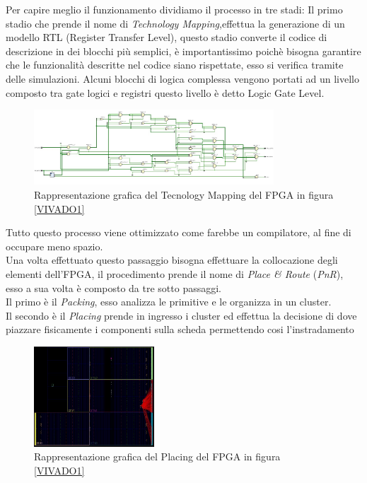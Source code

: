 Per capire meglio il funzionamento dividiamo il processo in tre stadi:
Il primo stadio che prende il nome di \textit{Technology Mapping},effettua la generazione di un modello RTL (Register Transfer Level), questo stadio converte il codice di descrizione in dei blocchi più semplici, è importantissimo poichè bisogna garantire che le funzionalità descritte nel codice siano rispettate, esso si verifica tramite delle simulazioni. Alcuni blocchi di logica complessa vengono portati ad un livello composto tra gate logici e registri questo livello è detto Logic Gate Level.
\begin{figure}[h]
\centering
\includegraphics[width=0.8\textwidth]{images/RTL.jpg}
\caption{Rappresentazione grafica del Tecnology Mapping del FPGA in figura \ref{VIVADO1}}
\end{figure}\clearpage
Tutto questo processo viene ottimizzato come farebbe un compilatore, al fine di occupare meno spazio.\\
Una volta effettuato questo passaggio bisogna effettuare la collocazione degli elementi dell'FPGA, il procedimento prende il nome di \textit{Place \& Route} (\textit{PnR}), esso a sua volta è composto da tre sotto passaggi.\\
Il primo è il \textit{Packing}, esso analizza le primitive e le organizza in un cluster.\\
Il secondo è il \textit{Placing} prende in ingresso i cluster ed effettua la decisione di dove piazzare fisicamente i componenti sulla scheda permettendo cosi l'instradamento
\begin{figure}[h]
\centering
\includegraphics[width=0.4\textwidth]{images/Place.jpg}
\caption{Rappresentazione grafica del Placing del FPGA in figura \ref{VIVADO1}}
\end{figure}\\
